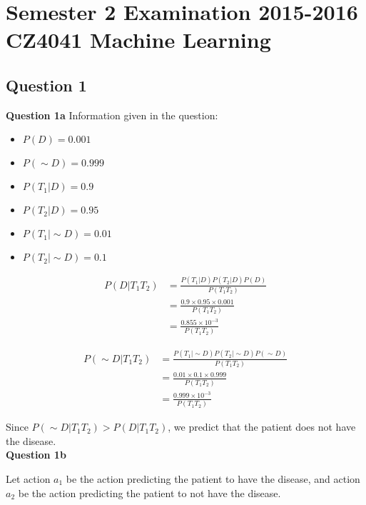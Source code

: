 \documentclass[11pt,a4paper]{report}
\begin{document}
\chapter{Semester 2 Examination 2015-2016\\CZ4041 Machine Learning}

\begin{multicols*}{2}

\section{Question 1}
\noindent \textbf{Question 1a}
\noindent Information given in the question:
\begin{itemize}
  \item $P(D) = 0.001$
  \item $P(\sim D) = 0.999$
  \item $P(T_1|D) = 0.9$
  \item $P(T_2|D) = 0.95$
  \item $P(T_1|\sim D) = 0.01$
  \item $P(T_2|\sim D) = 0.1$
\end{itemize}

\begin{equation*}
\begin{split}
P(D|T_1 T_2) &= \frac{P(T_1 | D) P(T_2 | D) P(D)}{P(T_1 T_2)}\\
&= \frac{0.9 \times 0.95 \times 0.001}{P(T_1 T_2)}\\
&= \frac{0.855 \times 10^{-3}}{P(T_1 T_2)}
\end{split}
\end{equation*}

\begin{equation*}
\begin{split}
P(\sim D|T_1 T_2) &= \frac{P(T_1 | \sim D) P(T_2 | \sim D) P(\sim D)}{P(T_1 T_2)}\\
&= \frac{0.01 \times 0.1 \times 0.999}{P(T_1 T_2)}\\
&= \frac{0.999 \times 10^{-3}}{P(T_1 T_2)}
\end{split}
\end{equation*}

\noindent Since $P(\sim D|T_1 T_2) > P(D|T_1 T_2)$, we predict that the patient does not have the disease.\\

\noindent \textbf{Question 1b}

\noindent Let action $a_1$ be the action predicting the patient to have the disease, and action $a_2$ be the action predicting the patient to not have the disease.


\end{multicols*}
\end{document}
